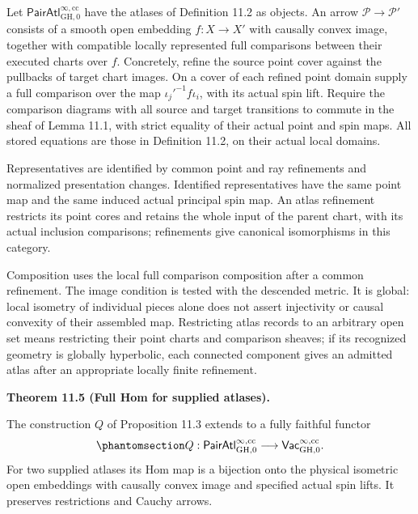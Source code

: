 \documentclass[
  english,
  11pt,
  reqno]{amsart}
\makeatletter
\newcommand{\pandocstatementheading}[1]{%
  \par\if@nobreak\else
    \addpenalty{\@beginparpenalty}%
    \addvspace{.5\baselineskip plus .2\baselineskip minus .2\baselineskip}%
  \fi
  {\normalfont\bfseries #1\par}%
  \nobreak\@afterindenttrue\@afterheading
}
\makeatother
\begin{document}
Let \(\mathsf{PairAtl}^{\infty,\mathrm{cc}}_{\mathrm{GH},0}\) have the
atlases of Definition 11.2 as objects. An arrow
\(\mathcal P\to\mathcal P'\) consists of a smooth open embedding
\(f:X\to X'\) with causally convex image, together with compatible
locally represented full comparisons between their executed charts over
\(f\). Concretely, refine the source point cover against the pullbacks
of target chart images. On a cover of each refined point domain supply a
full comparison over the map \(\iota_j'^{-1}f\iota_i\), with its actual
spin lift. Require the comparison diagrams with all source and target
transitions to commute in the sheaf of Lemma 11.1, with strict equality
of their actual point and spin maps. All stored equations are those in
Definition 11.2, on their actual local domains.

Representatives are identified by common point and ray refinements and
normalized presentation changes. Identified representatives have the
same point map and the same induced actual principal spin map. An atlas
refinement restricts its point cores and retains the whole input of the
parent chart, with its actual inclusion comparisons; refinements give
canonical isomorphisms in this category.

Composition uses the local full comparison composition after a common
refinement. The image condition is tested with the descended metric. It
is global: local isometry of individual pieces alone does not assert
injectivity or causal convexity of their assembled map. Restricting
atlas records to an arbitrary open set means restricting their point
charts and comparison sheaves; if its recognized geometry is globally
hyperbolic, each connected component gives an admitted atlas after an
appropriate locally finite refinement.

\pandocstatementheading{\protect{}\label{thm:ordinary-atlas-full-hom}Theorem 11.5 (Full Hom for supplied atlases).}

The construction \(Q\) of Proposition 11.3 extends to a fully faithful
functor
\begin{equation}\protect\phantomsection\label{eq:ordinary-atlas-geometric-functor}{
Q:\mathsf{PairAtl}^{\infty,\mathrm{cc}}_{\mathrm{GH},0}
\longrightarrow\mathsf{Vac}^{\infty,\mathrm{cc}}_{\mathrm{GH},0}.
}\end{equation} For two supplied atlases its Hom map is a bijection onto
the physical isometric open embeddings with causally convex image and
specified actual spin lifts. It preserves restrictions and Cauchy
arrows.
\end{document}
